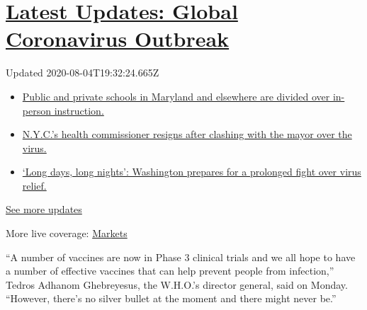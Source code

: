 \hypertarget{latest-updates-global-coronavirus-outbreak}{%
\section{\texorpdfstring{\href{https://www.nytimes.com/2020/08/04/world/coronavirus-cases.html?action=click\&pgtype=Article\&state=default\&region=MAIN_CONTENT_1\&context=storylines_live_updates}{Latest
Updates: Global Coronavirus
Outbreak}}{Latest Updates: Global Coronavirus Outbreak}}\label{latest-updates-global-coronavirus-outbreak}}

Updated 2020-08-04T19:32:24.665Z

\begin{itemize}
\tightlist
\item
  \href{https://www.nytimes.com/2020/08/04/world/coronavirus-cases.html?action=click\&pgtype=Article\&state=default\&region=MAIN_CONTENT_1\&context=storylines_live_updates\#link-4825b93}{Public
  and private schools in Maryland and elsewhere are divided over
  in-person instruction.}
\item
  \href{https://www.nytimes.com/2020/08/04/world/coronavirus-cases.html?action=click\&pgtype=Article\&state=default\&region=MAIN_CONTENT_1\&context=storylines_live_updates\#link-4d1eafa8}{N.Y.C.'s
  health commissioner resigns after clashing with the mayor over the
  virus.}
\item
  \href{https://www.nytimes.com/2020/08/04/world/coronavirus-cases.html?action=click\&pgtype=Article\&state=default\&region=MAIN_CONTENT_1\&context=storylines_live_updates\#link-6b644638}{`Long
  days, long nights': Washington prepares for a prolonged fight over
  virus relief.}
\end{itemize}

\href{https://www.nytimes.com/2020/08/04/world/coronavirus-cases.html?action=click\&pgtype=Article\&state=default\&region=MAIN_CONTENT_1\&context=storylines_live_updates}{See
more updates}

More live coverage:
\href{https://www.nytimes.com/live/2020/08/04/business/stock-market-today-coronavirus?action=click\&pgtype=Article\&state=default\&region=MAIN_CONTENT_1\&context=storylines_live_updates}{Markets}

``A number of vaccines are now in Phase 3 clinical trials and we all
hope to have a number of effective vaccines that can help prevent people
from infection,'' Tedros Adhanom Ghebreyesus, the W.H.O.'s director
general, said on Monday. ``However, there's no silver bullet at the
moment and there might never be.''

